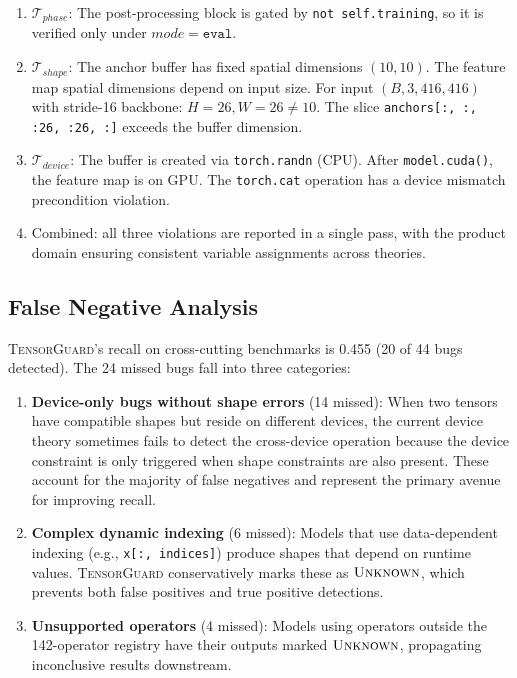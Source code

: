 \documentclass[10pt]{article}
\newcommand{\tguard}{\textsc{TensorGuard}}
\newcommand{\Tshape}{\mathcal{T}_{\mathit{shape}}}
\newcommand{\Tdevice}{\mathcal{T}_{\mathit{device}}}
\newcommand{\Tphase}{\mathcal{T}_{\mathit{phase}}}
\theoremstyle{plain}
\theoremstyle{definition}
\theoremstyle{remark}
\begin{document}
\begin{enumerate}[nosep]
  \item $\Tphase$: The post-processing block is gated by
    \texttt{not self.training}, so it is verified only under
    $\mathit{mode} = \texttt{eval}$.

  \item $\Tshape$: The anchor buffer has fixed spatial dimensions
    $(10, 10)$.  The feature map spatial dimensions depend on input
    size.  For input $(B, 3, 416, 416)$ with stride-16 backbone:
    $H = 26, W = 26 \neq 10$.  The slice
    \texttt{anchors[:, :, :26, :26, :]} exceeds the buffer dimension.

  \item $\Tdevice$: The buffer is created via \texttt{torch.randn}
    (CPU).  After \texttt{model.cuda()}, the feature map is on GPU.
    The \texttt{torch.cat} operation has a device mismatch precondition
    violation.

  \item Combined: all three violations are reported in a single pass,
    with the product domain ensuring consistent variable assignments
    across theories.
\end{enumerate}

\subsection{False Negative Analysis}

\tguard{}'s recall on cross-cutting benchmarks is 0.455 (20 of 44
bugs detected).  The 24 missed bugs fall into three categories:

\begin{enumerate}[leftmargin=2em]
  \item \textbf{Device-only bugs without shape errors} (14 missed):
    When two tensors have compatible shapes but reside on different
    devices, the current device theory sometimes fails to detect the
    cross-device operation because the device constraint is only
    triggered when shape constraints are also present.  These
    account for the majority of false negatives and represent the
    primary avenue for improving recall.

  \item \textbf{Complex dynamic indexing} (6 missed):
    Models that use data-dependent indexing
    (e.g., \texttt{x[:, indices]}) produce shapes that depend on
    runtime values.  \tguard{} conservatively marks these as
    $\textsc{Unknown}$, which prevents both false positives and
    true positive detections.

  \item \textbf{Unsupported operators} (4 missed):
    Models using operators outside the 142-operator registry have
    their outputs marked $\textsc{Unknown}$, propagating
    inconclusive results downstream.
\end{enumerate}
\end{document}
